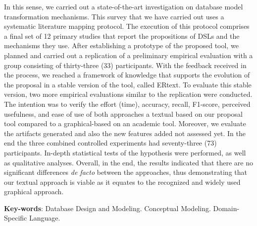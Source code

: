 \begin{resumo}[Abstract]
In this sense, we carried out a state-of-the-art investigation on database model transformation mechanisms.
This survey that we have carried out uses a systematic literature mapping protocol.
The execution of this protocol comprises a final set of 12 primary studies that report the propositions of DSLs and the mechanisms they use.
After establishing a prototype of the proposed tool, we planned and carried out a replication of a preliminary empirical evaluation with a group consisting of thirty-three (33) participants.
With the feedback received in the process, we reached a framework of knowledge that supports the evolution of the proposal in a stable version of the tool, called ERtext.
To evaluate this stable version, two more empirical evaluations similar to the replication were conducted.
The intention was to verify the effort (time), accuracy, recall, F1-score, perceived usefulness, and ease of use of both approaches a textual based on our proposal tool compared to a graphical-based on an academic tool.
Moreover, we evaluate the artifacts generated and also the new features added not assessed yet.
In the end the three combined controlled experiments had seventy-three (73) participants. 
In-depth statistical tests of the hypothesis were performed, as well as qualitative analyses. 
Overall, in the end, the results indicated that there are no significant differences \textit{de facto} between the approaches, thus demonstrating that our textual approach is viable as it equates to the recognized and widely used graphical approach.



\vspace{\onelineskip}

 \noindent 
 \textbf{Key-words}: Database Design and Modeling. Conceptual Modeling. Domain-Specific Language.
\end{resumo}